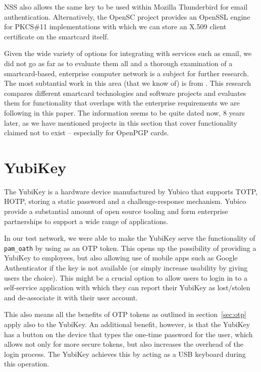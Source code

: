 \documentclass{report}
\begin{document}
NSS also allows the same key to be used within Mozilla Thunderbird for
email authentication. Alternatively, the OpenSC project provides an
OpenSSL engine for PKCS\#11 implementations with which we can store an X.509
client certificate on the smartcard itself.

Given the wide variety of
options for integrating with services such as email, we did not go as far
as to evaluate them all and a thorough examination of a smartcard-based,
enterprise computer network is a subject for further research. The most
subtantial work in this area (that we know of) is from \textcite{grossesecuring}.
This research compares different smartcard technologies and software projects
and evaluates them for functionality that overlaps with the enterprise
requirements we are following in this paper. The information seems to be
quite dated now, 8 years later, as we have mentioned projects in this
section that cover functionality claimed not to exist -- especially for OpenPGP
cards.

\section{YubiKey}

The YubiKey \parencite{merkel2009yubikey} is a hardware device
manufactured by Yubico that supports TOTP, HOTP, storing a static password and
a challenge-response mechanism. Yubico provide a substantial amount of
open source tooling and form enterprise partnerships to support a wide
range of applications.

In our test network, we were able to make the YubiKey serve the functionality
of \texttt{pam\_oath} by using as an OTP token. This opens up the possibility
of providing a YubiKey to employees, but also allowing use of mobile apps
such as Google Authenticator if the key is not available (or simply increase
usability by giving users the choice). This might be a crucial option to
allow users to login in to a self-service application with which they can
report their YubiKey as lost/stolen and de-associate it with their user
account.

This also means all the benefits of OTP tokens as outlined in
section~\ref{sec:otp} apply also to the YubiKey. An additional benefit,
however, is that the YubiKey has a button on the device that types the
one-time password for the user, which allows not only for more secure tokens,
but also increases the overhead of the login process. The YubiKey achieves
this by acting as a USB keyboard during this operation.
\end{document}
